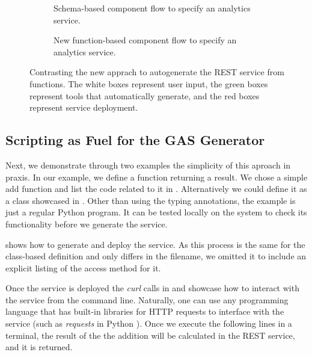\begin{figure}[htb]

\begin{subfigure}{.48\columnwidth}
    \centering
    \begin{minipage}[b]{.6\columnwidth}
    
    \end{minipage}
    \caption{Schema-based component flow to specify an analytics service.}
    \label{fig:flow-schema}
\end{subfigure}
\begin{subfigure}{.48\columnwidth}
  \centering
  \vspace{1.2cm}
  \begin{minipage}[b]{.6\columnwidth}
  
    \end{minipage}  
  \caption{New \Cloudmesh function-based component flow to specify an analytics service.}
  \label{fig:flow-function}
\end{subfigure}

\caption{Contrasting the new apprach to autogenerate the REST service from functions. The white boxes represent user input, the green boxes represent tools that automatically generate, and the red boxes represent service deployment.}

\end{figure}


\subsection{Scripting as Fuel for the GAS Generator}

Next, we demonstrate through two examples the simplicity of this
aproach in praxis. In our example, we define a function returning a
result. We chose a simple add function and list the code related to it
in . Alternatively we could define it as a class
showcased in . Other
than using the typing annotations, the example is
just a regular Python program. It can be tested locally on the system
to check its functionality before we generate the service.

 shows how to generate and deploy the
service. As this process is the same for the class-based definition
and only differs in the filename, we omitted it to include an explicit
listing of the access method for it. 

Once the service is deployed the {\em curl} calls
in  and  showcase how
to interact with the service from the command line. Naturally, one can
use any programming language that has built-in libraries for HTTP
requests to interface with the service (such as {\em requests} in
Python \cite{www-python-requests}).  Once we execute the following
lines in a terminal, the result of the the addition will be calculated
in the REST service, and it is returned.

